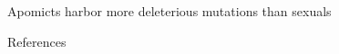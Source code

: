 \documentclass[final,20pt]{beamer}
\newlength{\sepwidth}
\newlength{\colwidth}
\newcommand{\separatorcolumn}{\begin{column}{\sepwidth}\end{column}}
\begin{document}
\begin{frame}[t]
\begin{columns}[t]
\begin{column}{\colwidth}
\begin{alertblock}{Apomicts harbor more deleterious mutations than sexuals}
  \end{alertblock}

  \begin{block}{\large References}

    \nocite{*}
    \footnotesize{}

  \end{block}


\end{column}

\separatorcolumn
\end{columns}
\end{frame}
\end{document}
